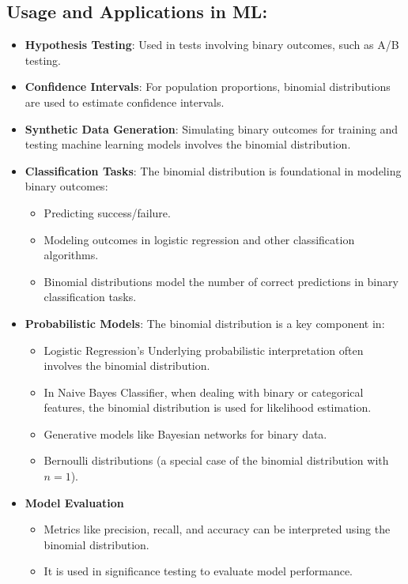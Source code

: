 \subsection*{Usage and Applications in ML:}
\begin{itemize}
    \item \textbf{Hypothesis Testing}: Used in tests involving binary outcomes, such as A/B testing.
    \item \textbf{Confidence Intervals}: For population proportions, binomial distributions are used to estimate confidence intervals.
    \item \textbf{Synthetic Data Generation}: Simulating binary outcomes for training and testing machine learning models involves the binomial distribution.
    \item \textbf{Classification Tasks}: The binomial distribution is foundational in modeling binary outcomes:
    \begin{itemize}
        \item Predicting success/failure.
        \item Modeling outcomes in logistic regression and other classification algorithms.
        \item Binomial distributions model the number of correct predictions in binary classification tasks.
    \end{itemize}
    \item \textbf{Probabilistic Models}: The binomial distribution is a key component in:
    \begin{itemize}
        \item Logistic Regression's Underlying probabilistic interpretation often involves the binomial distribution.
        \item In Naive Bayes Classifier, when dealing with binary or categorical features, the binomial distribution is used for likelihood estimation.
        \item Generative models like Bayesian networks for binary data.
        \item Bernoulli distributions (a special case of the binomial distribution with $n = 1$).
    \end{itemize}
    \item \textbf{Model Evaluation}
    \begin{itemize}
        \item Metrics like precision, recall, and accuracy can be interpreted using the binomial distribution.
        \item It is used in significance testing to evaluate model performance.
    \end{itemize}
\end{itemize}

